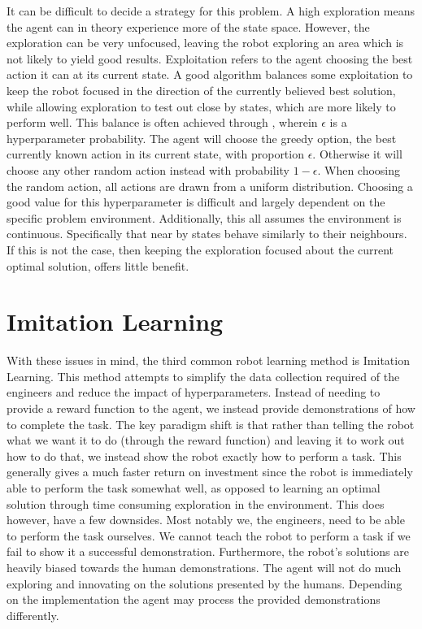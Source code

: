 It can be difficult to decide a strategy for this  problem. A high exploration means the agent can in theory experience more of the state space. However, the exploration can be very unfocused, leaving the robot exploring an area which is not likely to yield good results. Exploitation refers to the agent choosing the best action it can at its current state. A good algorithm balances some exploitation to keep the robot focused in the direction of the currently believed best solution, while allowing exploration to test out close by states, which are more likely to perform well. This balance is often achieved through , wherein $\epsilon$ is a hyperparameter probability. The agent will choose the greedy option, the best currently known action in its current state, with proportion $\epsilon$. Otherwise it will choose any other random action instead with probability $1-\epsilon$. When choosing the random action, all actions are drawn from a uniform distribution. Choosing a good value for this hyperparameter is difficult and largely dependent on the specific problem environment. Additionally, this all assumes the environment is continuous. Specifically that near by states behave similarly to their neighbours. If this is not the case, then keeping the exploration focused about the current optimal solution, offers little benefit.

\section{Imitation Learning}
\label{sec:imitation-learning}
With these issues in mind, the third common robot learning method is Imitation Learning. This method attempts to simplify the data collection required of the engineers and reduce the impact of hyperparameters. Instead of needing to provide a reward function to the agent, we instead provide demonstrations of how to complete the task. The key paradigm shift is that rather than telling the robot what we want it to do (through the reward function) and leaving it to work out how to do that, we instead show the robot exactly how to perform a task. This generally gives a much faster return on investment since the robot is immediately able to perform the task somewhat well, as opposed to learning an optimal solution through time consuming exploration in the environment. This does however, have a few downsides. Most notably we, the engineers, need to be able to perform the task ourselves. We cannot teach the robot to perform a task if we fail to show it a successful demonstration. Furthermore, the robot's solutions are heavily biased towards the human demonstrations. The agent will not do much exploring and innovating on the solutions presented by the humans. Depending on the implementation the agent may process the provided demonstrations differently.

